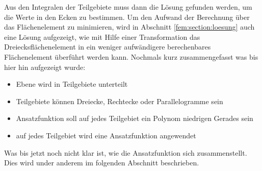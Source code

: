 Aus den Integralen der Teilgebiete muss dann die Lösung gefunden werden, um die Werte in den Ecken zu bestimmen. Um den Aufwand der Berechnung über das Flächenelement zu minimieren, wird in Abschnitt \ref{fem:section:loesung} auch eine Lösung aufgezeigt, wie mit Hilfe einer Transformation das Dreiecksflächenelement in ein weniger aufwändigere berechenbares Flächenelement überführt werden kann.
Nochmals kurz zusammengefasst was bis hier hin aufgezeigt wurde:
\begin{itemize}
	\item Ebene wird in Teilgebiete unterteilt
	\item Teilgebiete können Dreiecke, Rechtecke oder Parallelogramme sein
	\item Ansatzfunktion soll auf jedes Teilgebiet ein Polynom niedrigen Gerades sein
	\item auf jedes Teilgebiet wird eine Ansatzfunktion angewendet
\end{itemize} 
Was bis jetzt noch nicht klar ist, wie die Ansatzfunktion sich zusammenstellt. Dies wird under anderem im folgenden Abschnitt beschrieben.





